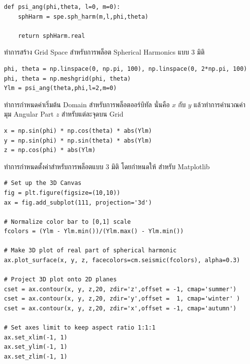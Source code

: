 \begin{lstlisting}[style=MyPython]
def psi_ang(phi,theta, l=0, m=0):
    sphHarm = spe.sph_harm(m,l,phi,theta)
    
    return sphHarm.real
\end{lstlisting}

\vspace{1em}
\noindent ทำการสร้าง Grid Space สำหรับการพล็อต Spherical Harmonics แบบ 3 มิติ

\begin{lstlisting}[style=MyPython]
phi, theta = np.linspace(0, np.pi, 100), np.linspace(0, 2*np.pi, 100)
phi, theta = np.meshgrid(phi, theta)
Ylm = psi_ang(theta,phi,l=2,m=0)
\end{lstlisting}

\vspace{1em}
\noindent ทำการกำหนดค่าเริ่มต้น Domain สำหรับการพล็อตออร์บิทัล นั่นคือ $x$ กับ $y$ แล้วทำการคำนวณค่ามุม Angular Part $z$ สำหรับแต่ละจุดบน Grid

\begin{lstlisting}[style=MyPython]
x = np.sin(phi) * np.cos(theta) * abs(Ylm)
y = np.sin(phi) * np.sin(theta) * abs(Ylm)
z = np.cos(phi) * abs(Ylm)
\end{lstlisting}

\vspace{1em}
\noindent ทำการกำหนดตั้งค่าสำหรับการพล็อตแบบ 3 มิติ โดยกำหนดให้  สำหรับ Matplotlib

\begin{lstlisting}[style=MyPython]
# Set up the 3D Canvas
fig = plt.figure(figsize=(10,10))
ax = fig.add_subplot(111, projection='3d')

# Normalize color bar to [0,1] scale
fcolors = (Ylm - Ylm.min())/(Ylm.max() - Ylm.min())

# Make 3D plot of real part of spherical harmonic
ax.plot_surface(x, y, z, facecolors=cm.seismic(fcolors), alpha=0.3)

# Project 3D plot onto 2D planes
cset = ax.contour(x, y, z,20, zdir='z',offset = -1, cmap='summer')
cset = ax.contour(x, y, z,20, zdir='y',offset =  1, cmap='winter' )
cset = ax.contour(x, y, z,20, zdir='x',offset = -1, cmap='autumn')

# Set axes limit to keep aspect ratio 1:1:1
ax.set_xlim(-1, 1)
ax.set_ylim(-1, 1)
ax.set_zlim(-1, 1)
\end{lstlisting}

